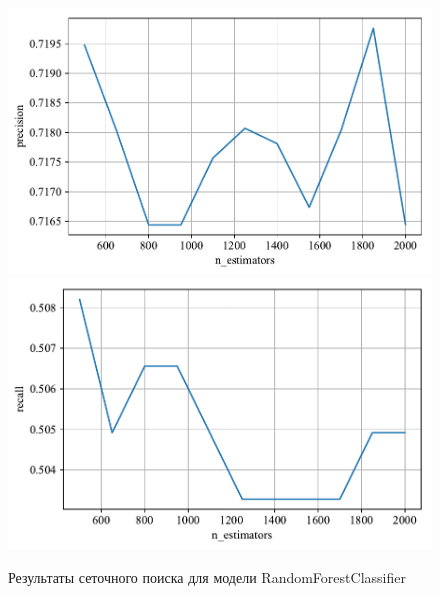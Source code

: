 \begin{figure}
    \centering
    \includegraphics{../images/toloka_randomforest_precision.pdf}
    \includegraphics{../images/toloka_randomforest_recall.pdf}
    \caption{Результаты сеточного поиска для модели RandomForestClassifier}
    \label{fig:toloka_randomforest}
\end{figure}

